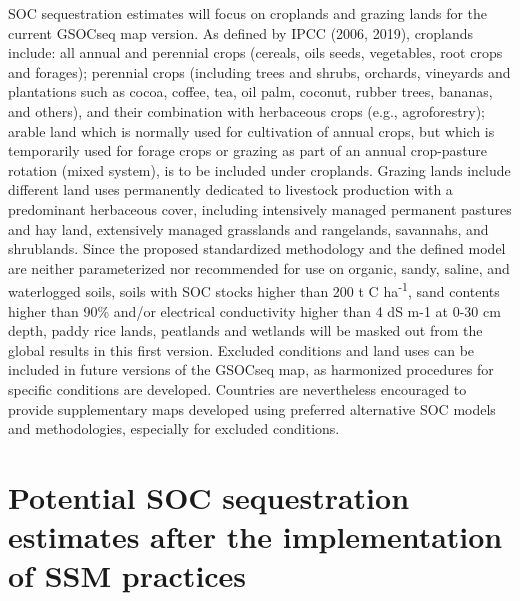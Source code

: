 \documentclass[
  10pt,
  b5paper,
]{book}
\begin{document}
SOC sequestration estimates will focus on croplands and grazing lands for the current GSOCseq map version. As defined by IPCC (2006, 2019), croplands include: all annual and perennial crops (cereals, oils seeds, vegetables, root crops and forages); perennial crops (including trees and shrubs, orchards, vineyards and plantations such as cocoa, coffee, tea, oil palm, coconut, rubber trees, bananas, and others), and their combination with herbaceous crops (e.g., agroforestry); arable land which is normally used for cultivation of annual crops, but which is temporarily used for forage crops or grazing as part of an annual crop-pasture rotation (mixed system), is to be included under croplands. Grazing lands include different land uses permanently dedicated to livestock production with a predominant herbaceous cover, including intensively managed permanent pastures and hay land, extensively managed grasslands and rangelands, savannahs, and shrublands.
Since the proposed standardized methodology and the defined model are neither parameterized nor recommended for use on organic, sandy, saline, and waterlogged soils, soils with SOC stocks higher than 200 t C ha\textsuperscript{-1}, sand contents higher than 90\% and/or electrical conductivity higher than 4 dS m-1 at 0-30 cm depth, paddy rice lands, peatlands and wetlands will be masked out from the global results in this first version.
Excluded conditions and land uses can be included in future versions of the GSOCseq map, as harmonized procedures for specific conditions are developed. Countries are nevertheless encouraged to provide supplementary maps developed using preferred alternative SOC models and methodologies, especially for excluded conditions.

\hypertarget{potential-soc-sequestration-estimates-after-the-implementation-of-ssm-practices}{%
\section{Potential SOC sequestration estimates after the implementation of SSM practices}\label{potential-soc-sequestration-estimates-after-the-implementation-of-ssm-practices}}
\end{document}
